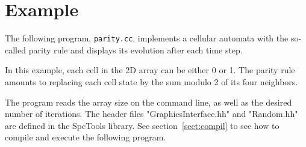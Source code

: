 \documentclass[12pt,a4paper]{article}
\begin{document}
\section{Example}\label{sect:parity}

The following program, {\tt parity.cc}, implements a cellular automata
with the so-called parity rule and displays its evolution after each
time step. 

In this example, each cell in the 2D array can be either 0 or 1. The parity
rule amounts to replacing each cell state by the sum modulo 2 of its
four neighbors.

The program reads the array size on the command line, as well as the
desired number of iterations.  The header files "GraphicsInterface.hh"
and "Random.hh" are defined in the SpcTools library. See
section~\ref{sect:compil} to see how to compile and execute the following program.
\end{document}
